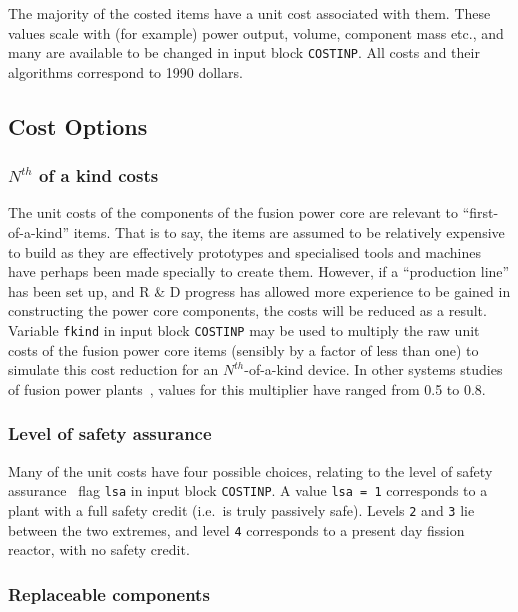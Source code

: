 \documentclass[11pt,a4paper]{report}
\begin{document}
The majority of the costed items have a unit cost associated with them. These
values scale with (for example) power output, volume, component mass etc., and
many are available to be changed in input block {\tt COSTINP}. All costs and
their algorithms correspond to 1990 dollars.

\setlength{\parskip}{0mm}
\subsection{Cost Options}

\subsubsection{$N^{th}$ of a kind costs}

The unit costs of the components of the fusion power core are relevant to
``first-of-a-kind'' items. That is to say, the items are assumed to be
relatively expensive to build as they are effectively prototypes and
specialised tools and machines have perhaps been made specially to create
them. However, if a ``production line'' has been set up, and R \& D progress
has allowed more experience to be gained in constructing the power core
components, the costs will be reduced as a result. Variable \texttt{fkind} in
input block \texttt{COSTINP} may be used to multiply the raw unit costs of the
fusion power core items (sensibly by a factor of less than one) to simulate
this cost reduction for an $N^{th}$-of-a-kind device. In other systems studies
of fusion power plants~\cite{galambos}, values for this multiplier have ranged
from 0.5 to 0.8.

\subsubsection{Level of safety assurance}

Many of the unit costs have four possible choices, relating to the level of
safety assurance~\cite{lsa} flag {\tt lsa} in input block {\tt COSTINP}. A
value {\tt lsa = 1} corresponds to a plant with a full safety credit (i.e.\ is
truly passively safe). Levels {\tt 2} and {\tt 3} lie between the two
extremes, and level {\tt 4} corresponds to a present day fission reactor, with
no safety credit.

\subsubsection{Replaceable components}
\end{document}
